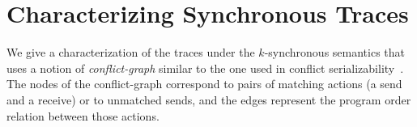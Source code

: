 \section{Characterizing Synchronous Traces}

We give a characterization of the traces under the $k$-synchronous semantics that uses a notion of \emph{conflict-graph} similar to the one used in conflict serializability~\cite{}. The nodes of the conflict-graph correspond to pairs of matching actions (a send and a receive) or to unmatched sends, and the edges represent the program order relation between those actions.




%

%





